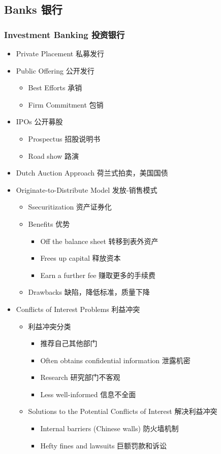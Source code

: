 \documentclass[a4paper,6pt,twoside,openany]{article}
\begin{document}
\subsection{Banks 银行}
\subsubsection{Investment Banking 投资银行}
\begin{itemize}
\item Private Placement 私募发行
\item Public Offering 公开发行
  \begin{itemize}
  \item Best Efforts 承销
  \item Firm Commitment 包销
  \end{itemize}
\item IPOs 公开募股
  \begin{itemize}
  \item Prospectus 招股说明书
  \item Road show 路演
  \end{itemize}
\item Dutch Auction Approach 荷兰式拍卖，美国国债
\item Originate-to-Distribute Model 发放-销售模式
  \begin{itemize}
  \item Ssecuritization 资产证券化
  \item Benefits 优势
    \begin{itemize}
    \item Off the balance sheet 转移到表外资产
    \item Frees up capital 释放资本
    \item Earn a further fee 赚取更多的手续费
    \end{itemize}
  \item Drawbacks 缺陷，降低标准，质量下降
  \end{itemize}
\item Conflicts of Interest Problems 利益冲突
  \begin{itemize}
  \item 利益冲突分类
    \begin{itemize}
        \item 推荐自己其他部门
  \item Often obtains confidential information 泄露机密
  \item Research 研究部门不客观
  \item Less well-informed 信息不全面
    \end{itemize}
  \item Solutions to the Potential Conflicts of Interest 解决利益冲突
    \begin{itemize}
        \item Internal barriers (Chinese walls) 防火墙机制
        \item Hefty fines and lawsuits 巨额罚款和诉讼
    \end{itemize}
  \end{itemize}
\end{itemize}
\end{document}
